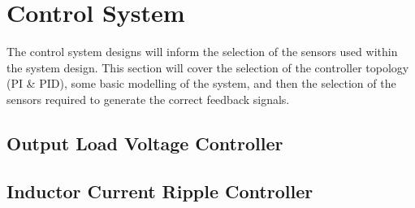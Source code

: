 \section{Control System}\label{S:control_design}

The control system designs will inform the selection of the sensors used within the system design. This section will cover the selection of the controller topology (PI \& PID), some basic modelling of the system, and then the selection of the sensors required to generate the correct feedback signals. 

\subsection{Output Load Voltage Controller}\label{S:output_control_design}

\subsection{Inductor Current Ripple Controller}\label{S:ripple_control_design}





